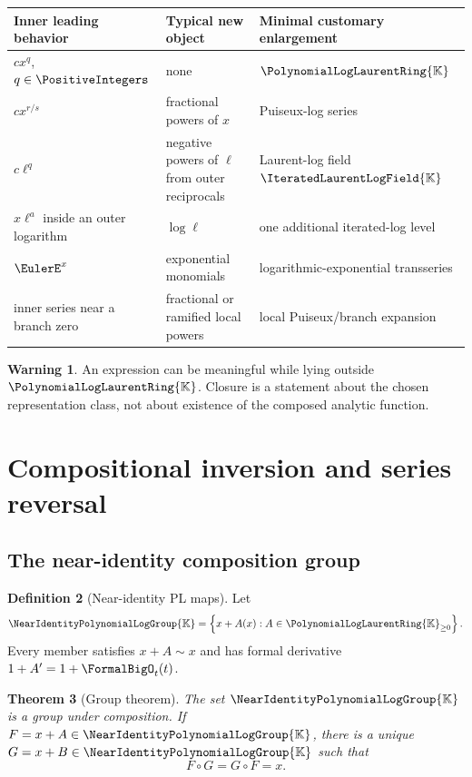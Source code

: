 \documentclass[11pt,oneside]{article}
\numberwithin{equation}{section}
\newtheorem{theorem}{Theorem}[section]
\theoremstyle{definition}
\newtheorem{definition}[theorem]{Definition}
\newtheorem{warning}[theorem]{Warning}
\newcommand{\K}{\mathbb{K}}
\newcommand{\PL}{\PolynomialLogLaurentRing{\K}}
\newcommand{\HL}{\IteratedLaurentLogField{\K}}
\newcommand{\Gnear}{\NearIdentityPolynomialLogGroup{\K}}
\newcommand{\as}{\sim}
\begin{document}
\begin{center}
\begin{tabularx}{0.95\textwidth}{@{}>{\raggedright\arraybackslash}p{}
>{\raggedright\arraybackslash}p{}X@{}}
\toprule
Inner leading behavior & Typical new object & Minimal customary enlargement\\
\midrule
\(cx^q\), \(q\in\PositiveIntegers\) & none & \(\PL\)\\
\(cx^{r/s}\) & fractional powers of \(x\) & Puiseux-log series\\
\(c\ell^q\) & negative powers of \(\ell\) from outer reciprocals & Laurent-log field \(\HL\)\\
\(x\ell^a\) inside an outer logarithm & \(\log\ell\) & one additional iterated-log level\\
\(\EulerE^x\) & exponential monomials & logarithmic-exponential transseries\\
inner series near a branch zero & fractional or ramified local powers & local Puiseux/branch expansion\\
\bottomrule
\end{tabularx}
\end{center}

\begin{warning}
An expression can be meaningful while lying outside \(\PL\).  Closure is a
statement about the chosen representation class, not about existence of the
composed analytic function.
\end{warning}

\section{Compositional inversion and series reversal}\label{sec:reversion}

\subsection{The near-identity composition group}

\begin{definition}[Near-identity PL maps]
Let
\begin{equation}\label{eq:near-group}
  \Gnear=\left\{x+A(x):A\in\PL_{\ge0}\right\}.
\end{equation}
Every member satisfies \(x+A\as x\) and has formal derivative
\(1+A'=1+\FormalBigO_t(t)\).
\end{definition}

\begin{theorem}[Group theorem]\label{thm:near-group}
The set \(\Gnear\) is a group under composition.  If
\(F=x+A\in\Gnear\), there is a unique
\(G=x+B\in\Gnear\) such that
\begin{equation}\label{eq:two-sided-inverse}
  F\circ G=G\circ F=x.
\end{equation}
\end{theorem}
\end{document}
